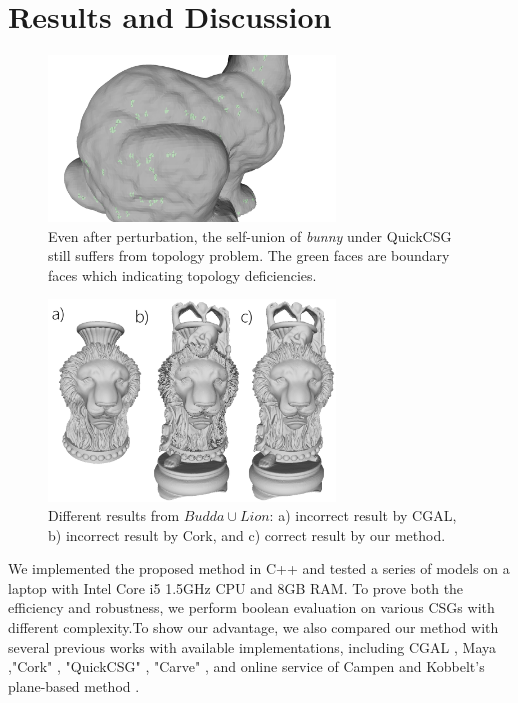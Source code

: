\documentclass[10pt,journal,compsoc]{IEEEtran}
\begin{document}
\fi

\section{Results and Discussion}


\begin{figure}[t]
\centering
\includegraphics[width=3in]{perturb}
\caption{Even after perturbation, the self-union of \emph{bunny} under QuickCSG still suffers from topology problem. The green faces are boundary faces which indicating topology deficiencies.}
\label{fig:boundaryedge}
\end{figure}

\begin{figure}[t]
\centering
\includegraphics[width=3in]{buddalion}
\caption{ Different results from $Budda\cup Lion$: a) incorrect result by CGAL, b) incorrect result by Cork, and c) correct result by our method. }
\label{fig:buddalion}
\end{figure}

We implemented the proposed method in C++ and tested a series of models on a laptop with Intel Core i5 1.5GHz CPU and 8GB RAM. To prove both the efficiency and robustness, we perform boolean evaluation on various CSGs with different complexity.To show our advantage, we also compared our method with several previous works with available implementations, including CGAL \cite{cgal:hk-bonp3-15a}, Maya \cite{Maya2015,barki2015exact},"Cork" \cite{Cork}, "QuickCSG" \cite{douze2015quickcsg}, "Carve" \cite{Carve}, and online service of Campen and Kobbelt's plane-based method \cite{campen2010exact,WebBSP}.
\end{document}
